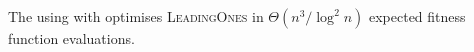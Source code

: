 %
%

\begin{theorem} \label{expohdOnLO}
The {\oneoneIA } using \IPHfcm{} with {\expoF } optimises
\textsc{LeadingOnes} in $\Theta(n^3/\log^2 n)$ expected fitness function
evaluations.
\end{theorem}

